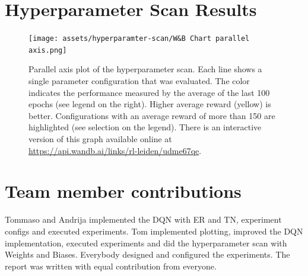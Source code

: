 \documentclass{article}
\begin{document}
\nocite{DBLP:books/sp/Plaat22}





\appendix
\section{Hyperparameter Scan Results}
\label{sec:hyperparameter-scan-results}

\begin{figure}[ht!]
   \centering
   \texttt{[image: assets/hyperparamter-scan/W\&B Chart parallel axis.png]}
   \caption{Parallel axis plot of the hyperparameter scan. 
      Each line shows a single parameter configuration that was evaluated. 
      The color indicates the performance measured by the average of the last 100 epochs (see legend on the right). 
      Higher average reward (yellow) is better.
      Configurations with an average reward of more than 150 are highlighted (see selection on the legend).
      There is an interactive version of this graph available online at \url{https://api.wandb.ai/links/rl-leiden/udme67qe}.
   }
   \label{fig_hyperparameter_scan_parallel_axis}
\end{figure}


\section{Team member contributions}
Tommaso and Andrija implemented the DQN with ER and TN, experiment configs and executed experiments.
Tom implemented plotting, improved the DQN implementation, executed experiments and did the hyperparameter scan with Weights and Biases.
Everybody designed and configured the experiments.
The report was written with equal contribution from everyone.
\end{document}
